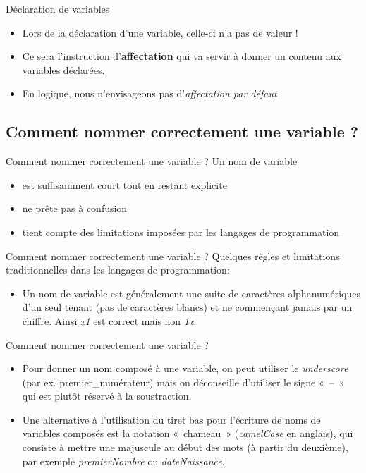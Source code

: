 \begin{frame}{Déclaration de variables}
	\begin{itemize}
	\item
	Lors de la déclaration d’une variable, celle-ci n’a pas de
	valeur ! 
	\item
	Ce sera l’instruction d’\textbf{affectation} 
	qui va servir à donner un contenu aux variables
	déclarées. 
	\item
	En logique, nous n’envisageons pas d’\textit{affectation par
	défaut}
	\end{itemize}
\end{frame}

\subsection{Comment nommer correctement une variable ?}

\begin{frame}{Comment nommer correctement une variable ?}
	Un nom de variable
	\begin{itemize}
		\item est suffisamment court tout en restant explicite
		\item ne prête pas à confusion
		\item tient compte des limitations imposées par les
			langages de programmation
	\end{itemize}
\end{frame}

\begin{frame}{Comment nommer correctement une variable ?}
	Quelques règles et limitations traditionnelles dans les langages
	de programmation:

	\bigskip
	
	\begin{itemize}
	\item 
		Un nom de variable est généralement une suite de caractères
		alphanumériques d’un seul tenant (pas de caractères blancs) et ne
		commençant jamais par un chiffre. Ainsi \textit{x1} est
		correct mais non \textit{1x}. 
	\end{itemize}
\end{frame}

\begin{frame}{Comment nommer correctement une variable ?}
	\begin{itemize}
	\item 
		Pour donner un nom composé à une variable, on peut utiliser le 
		\textit{underscore} (par ex. premier\_numérateur) mais on
		déconseille d’utiliser le signe «~–~» qui est plutôt réservé à la
		soustraction. 
	
	\bigskip
	
	\item 
		Une alternative à l’utilisation du tiret bas pour l’écriture de noms de
		variables composés est la notation «~chameau~» (\textit{camelCase} en
		anglais), qui consiste à mettre une majuscule au début des mots
		(à partir du deuxième), par exemple
		\textit{premierNombre} ou
		\textit{dateNaissance}.
		\end{itemize}
	\end{frame}

